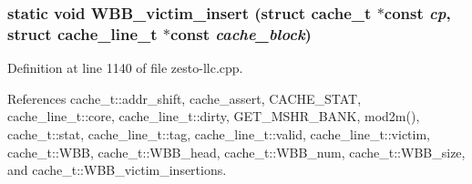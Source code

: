 \subsubsection[{WBB\_\-victim\_\-insert}]{\setlength{\rightskip}{0pt plus 5cm}static void WBB\_\-victim\_\-insert (struct {\bf cache\_\-t} $\ast$const  {\em cp}, \/  struct {\bf cache\_\-line\_\-t} $\ast$const  {\em cache\_\-block})\hspace{0.3cm}{\tt  [static]}}\label{zesto-llc_8cpp_4a2ea45f307de25eaffcd48354e67a18}




Definition at line 1140 of file zesto-llc.cpp.

References cache\_\-t::addr\_\-shift, cache\_\-assert, CACHE\_\-STAT, cache\_\-line\_\-t::core, cache\_\-line\_\-t::dirty, GET\_\-MSHR\_\-BANK, mod2m(), cache\_\-t::stat, cache\_\-line\_\-t::tag, cache\_\-line\_\-t::valid, cache\_\-line\_\-t::victim, cache\_\-t::WBB, cache\_\-t::WBB\_\-head, cache\_\-t::WBB\_\-num, cache\_\-t::WBB\_\-size, and cache\_\-t::WBB\_\-victim\_\-insertions.